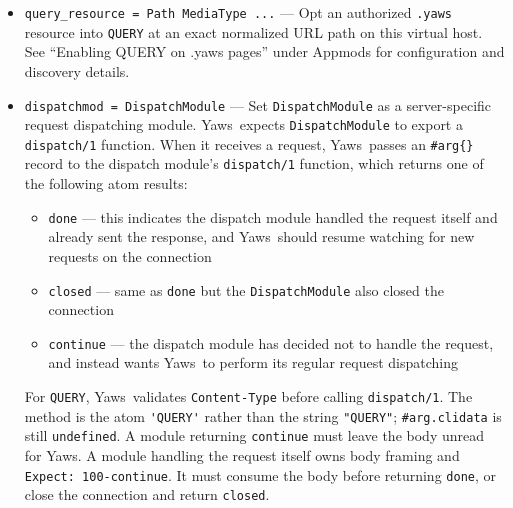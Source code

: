 \documentclass[11pt,oneside,english]{book}
\newcommand{\Yaws}            %
        {{\sc Yaws}}
\begin{document}
\begin{itemize}
             The \verb+Arg+ argument will have the missing path part supplied in
             its \verb+appmoddata+ field.

             It is also possible to exclude certain directories from appmod
             processing. This is particulaly interesting for '/' appmods.  Here
             is an example:
\begin{verbatim}
  appmods = </, myapp exclude_paths icons js top/static>
\end{verbatim}
             The above configuration will invoke the \verb+myapp+ erlang module
             on everything except any file found in directories \verb+icons+,
             \verb+js+ and \verb+top/static+ relative to the docroot.

\item       \verb+query_resource = Path MediaType ...+ ---
              Opt an authorized \verb+.yaws+ resource into \verb+QUERY+
              at an exact normalized URL path on this virtual host.
              See ``Enabling QUERY on .yaws pages'' under Appmods for
              configuration and discovery details.

\item       \verb+dispatchmod = DispatchModule+ ---
              Set \verb+DispatchModule+ as a server-specific request
              dispatching module. \Yaws\  expects \verb+DispatchModule+ to
              export a \verb+dispatch/1+ function. When it receives a
              request, \Yaws\  passes an \verb+#arg{}+ record to the dispatch
              module's \verb+dispatch/1+ function, which returns one of the
              following atom results:
              \begin{itemize}
                \item \verb+done+ --- this indicates the dispatch module
                  handled the request itself and already sent the response,
                  and \Yaws\  should resume watching for new requests on the
                  connection
                \item \verb+closed+ --- same as \verb+done+ but the
                  \verb+DispatchModule+ also closed the connection
                \item \verb+continue+ --- the dispatch module has decided
                  not to handle the request, and instead wants \Yaws\  to
                  perform its regular request dispatching
              \end{itemize}
              For \verb+QUERY+, \Yaws\ validates \verb+Content-Type+
              before calling \verb+dispatch/1+. The method is the atom
              \verb+'QUERY'+ rather than the string \verb+"QUERY"+;
              \verb+#arg.clidata+ is still \verb+undefined+.
              A module returning \verb+continue+ must leave the body
              unread for \Yaws. A module handling the request itself
              owns body framing and \verb+Expect: 100-continue+. It must
              consume the body before returning \verb+done+, or close
              the connection and return \verb+closed+.


\end{itemize}
\end{document}
